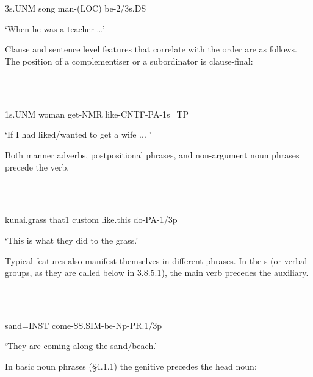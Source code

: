 \ea%
\label{ex:x676}
\gll {} \emphs{  {\dots} }\\
      \\
\glt
\z

3s.UNM  song  man-(LOC)  be-2/3s.DS

`When he was a teacher {\dots}'

Clause and sentence level features that correlate with the  order are as follows.  The position of a complementiser or a subordinator is clause-final:

\ea%
\label{ex:x677}
\gll {} \\
      \\
\glt
\z

1s.UNM  woman  get-NMR  like-CNTF-PA-1s=TP

`If I had liked/wanted to get a wife ...  '

Both manner adverbs, postpositional phrases, and non-argument noun phrases precede the verb.

\ea%
\label{ex:x678}
\gll {}  \\
      \\
\glt
\z

kunai.grass  that1  custom  like.this  do-PA-1/3p

`This is what they did to the  grass.'

Typical  features also manifest themselves in different phrases. In the s (or verbal groups, as they are called below in 3.8.5.1), the main verb precedes the auxiliary.

\ea%
\label{ex:x679}
\gll {}  \\
      \\
\glt
\z

sand=INST  come-SS.SIM-be-Np-PR.1/3p

`They are coming along the sand/beach.'

In basic noun phrases ({\S}4.1.1) the genitive precedes the head noun:

\ea%
\label{ex:x680}
\gll {} \\
      \\
\glt
\z

